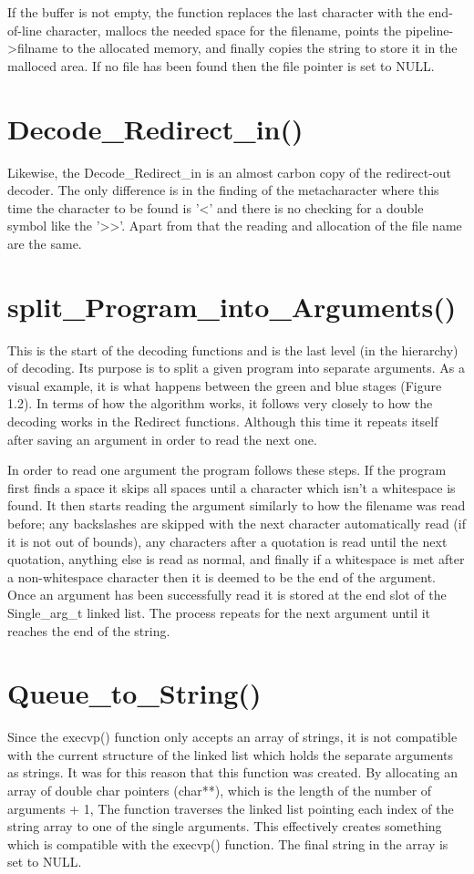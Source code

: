 \documentclass[12pt, a4paper]{report}
\begin{document}
If the buffer is not empty, the function replaces the last character with the end-of-line character, mallocs the needed space for the filename, points the pipeline->filname to the allocated memory, and finally copies the string to store it in the malloced area. If no file has been found then the file pointer is set to NULL.

\section{Decode\_Redirect\_in()}
Likewise, the Decode\_Redirect\_in is an almost carbon copy of the redirect-out decoder. The only difference is in the finding of the metacharacter where this time the character to be found is '<' and there is no checking for a double symbol like the '>>'. Apart from that the reading and allocation of the file name are the same.

\section{split\_Program\_into\_Arguments()}
This is the start of the decoding functions and is the last level (in the hierarchy) of decoding. Its purpose is to split a given program into separate arguments. As a visual example, it is what happens between the green and blue stages (Figure 1.2).  In terms of how the algorithm works, it follows very closely to how the decoding works in the Redirect functions. Although this time it repeats itself after saving an argument in order to read the next one.

In order to read one argument the program follows these steps. If the program first finds a space it skips all spaces until a character which isn't a whitespace is found. It then starts reading the argument similarly to how the filename was read before; any backslashes are skipped with the next character automatically read (if it is not out of bounds), any characters after a quotation is read until the next quotation, anything else is read as normal, and finally if a whitespace is met after a non-whitespace character then it is deemed to be the end of the argument. Once an argument has been successfully read it is stored at the end slot of the Single\_arg\_t linked list. The process repeats for the next argument until it reaches the end of the string.

\section{Queue\_to\_String()}
Since the execvp() function only accepts an array of strings, it is not compatible with the current structure of the linked list which holds the separate arguments as strings. It was for this reason that this function was created. By allocating an array of double char pointers (char**), which is the length of the number of arguments + 1, The function traverses the linked list pointing each index of the string array to one of the single arguments. This effectively creates something which is compatible with the execvp() function. The final string in the array is set to NULL.
\end{document}
